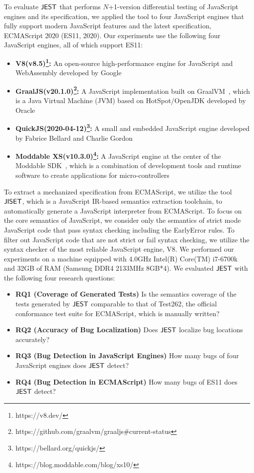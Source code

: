 To evaluate $\tool$ that performs $N$+1-version differential testing of JavaScript
engines and its specification, we applied the tool to four JavaScript engines that
fully support modern JavaScript features and the latest specification,
ECMAScript 2020 (ES11, 2020).  Our experiments use the following four JavaScript
engines, all of which support ES11:
\begin{itemize}
  \item \textbf{V8(v8.5)\footnote{https://v8.dev/}:} An open-source high-performance engine
    for JavaScript and WebAssembly developed by Google~\cite{v8}
  \item \textbf{GraalJS(v20.1.0)\footnote{https://github.com/graalvm/graaljs\#current-status}:} A JavaScript implementation built on
    GraalVM~\cite{graaljs}, which is a Java Virtual Machine (JVM) based on
    HotSpot/OpenJDK developed by Oracle
  \item \textbf{QuickJS(2020-04-12)\footnote{https://bellard.org/quickjs/}:} A small and embedded JavaScript engine developed by
    Fabrice Bellard and Charlie Gordon~\cite{qjs}
  \item \textbf{Moddable XS(v10.3.0)\footnote{https://blog.moddable.com/blog/xs10/}:} A JavaScript engine at the center of the Moddable
    SDK~\cite{xs}, which is a combination of development tools and runtime
    software to create applications for micro-controllers
\end{itemize}
To extract a mechanized specification from ECMAScript, we utilize the tool
$\jiset$, which is a JavaScript IR-based semantics extraction
toolchain, to automatically generate a JavaScript interpreter from ECMAScript.
To focus on the core semantics of JavaScript, we consider only the semantics of strict mode
JavaScript code that pass syntax checking including the EarlyError rules.  To
filter out JavaScript code that are not strict or fail syntax checking,
we utilize the syntax checker of the most reliable JavaScript engine, V8.
We performed our experiments on a machine equipped with 4.0GHz Intel(R) Core(TM)
i7-6700k and 32GB of RAM (Samsung DDR4 2133MHz 8GB*4).  We evaluated $\tool$
with the following four research questions:
\begin{itemize}
\item {\bf RQ1 (Coverage of Generated Tests)} Is the semantics
coverage of the tests generated by $\tool$ comparable to that of Test262,
the official conformance test suite for ECMAScript, which is manually written?
\item {\bf RQ2 (Accuracy of Bug Localization)} Does $\tool$ localize bug locations
accurately?
\item {\bf RQ3 (Bug Detection in JavaScript Engines)} How many
bugs of four JavaScript engines does $\tool$ detect?
\item {\bf RQ4 (Bug Detection in ECMAScript)} How many
bugs of ES11 does $\tool$ detect?
\end{itemize}


